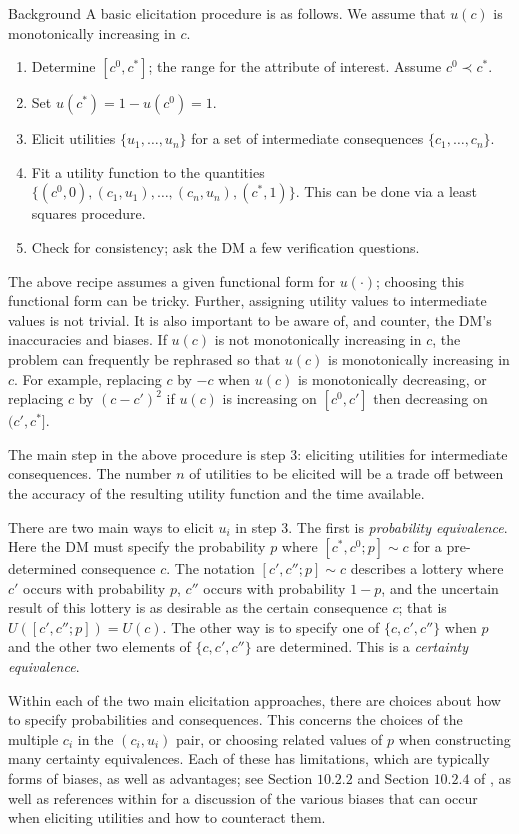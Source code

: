 \begin{chapter}{Background \label{Ch:background}}
A basic elicitation procedure is as follows. We assume that $u(c)$ is monotonically increasing in $c$.

\begin{enumerate}
	\item Determine $[c^0, c^*]$; the range for the attribute of interest. Assume $c^{0} \prec c^{*}$.
	\item Set $u(c^*) = 1 - u(c^0) = 1$.
	\item Elicit utilities $\{u_1, \ldots, u_n\}$ for a set of intermediate consequences $\{c_1, \ldots, c_n \}$.
	\item Fit a utility function to the quantities $\{(c^0, 0), (c_1, u_1), \ldots, (c_n, u_n), (c^*, 1) \}$. This can be done via a least squares procedure.
	\item Check for consistency; ask  the DM a few verification questions.
\end{enumerate}
The above recipe assumes a given functional form for $u(\cdot)$; choosing this functional form can be tricky. Further, assigning utility values to intermediate values is not trivial. It is also important to be aware of, and counter, the DM's inaccuracies and biases. If $u(c)$ is not monotonically increasing in $c$, the problem can frequently be rephrased so that $u(c)$ is monotonically increasing in $c$. For example, replacing $c$ by $-c$ when $u(c)$ is monotonically decreasing, or replacing $c$ by $(c - c')^2$ if $u(c)$ is increasing on $[c^{0}, c']$ then decreasing on $(c', c^{*} ]$.

The main step in the above procedure is step $3$: eliciting utilities for intermediate consequences. The number $n$ of utilities to be elicited will be a trade off between the accuracy of the resulting utility function and the time available.

There are two main ways to elicit $u_i$ in step $3$. The first is \textit{probability equivalence}. Here the DM must specify the probability $p$ where $[c^{*}, c^{0}; p] \sim c$ for a pre-determined consequence $c$. The notation $[c', c''; p] \sim c$ describes a lottery where $c'$ occurs with probability $p$, $c''$ occurs with probability $1-p$, and the uncertain result of this lottery is as desirable as the certain consequence $c$; that is $U([c', c''; p]) = U(c)$. The other way is to specify one of $\{ c, c', c''\}$ when $p$ and the other two elements of $\{c, c', c'' \}$ are determined. This is a \textit{certainty equivalence}.

Within each of the two main elicitation approaches, there are choices about how to specify probabilities and consequences. This concerns the choices of the multiple $c_i$ in the $(c_i, u_i)$ pair, or choosing related values of $p$ when constructing many certainty equivalences. Each of these has limitations, which are typically forms of biases, as well as advantages; see Section $10.2.2$ and Section $10.2.4$ of \citet{Gonzalez2018}, as well as references within for a discussion of the various biases that can occur when eliciting utilities and how to counteract them.

\end{chapter}
